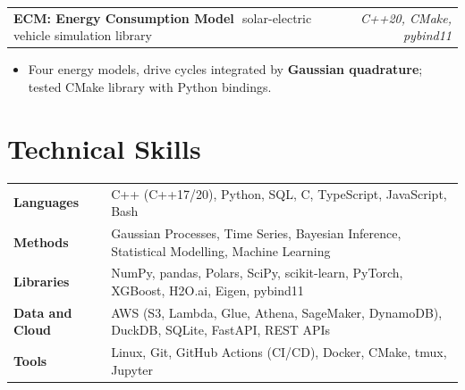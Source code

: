 \documentclass[10pt]{article}
\makeatletter
\newcommand{\project}[3]{%
  \vspace{3.5pt}%
  \begin{tabularx}{\linewidth}{@{}X r@{}}
    \textbf{#1}\,{\color{muted}\textbar}\, #2 & \textit{\color{muted}#3} \\
  \end{tabularx}\vspace{-1pt}}
\makeatother
\begin{document}
\project{ECM: Energy Consumption Model}{solar-electric vehicle simulation library}{C++20, CMake, pybind11}
\begin{itemize}
  \item Four energy models, drive cycles integrated by \textbf{Gaussian quadrature}; tested CMake library with Python bindings.
\end{itemize}

\section{Technical Skills}
\begin{tabularx}{\linewidth}{@{}p{2.95cm}X@{}}
  \textbf{Languages} & C++ (C++17/20), Python, SQL, C, TypeScript, JavaScript, Bash \\[1.5pt]
  \textbf{Methods} & Gaussian Processes, Time Series, Bayesian Inference, Statistical Modelling, Machine Learning \\[1.5pt]
  \textbf{Libraries} & NumPy, pandas, Polars, SciPy, scikit-learn, PyTorch, XGBoost, H2O.ai, Eigen, pybind11 \\[1.5pt]
  \textbf{Data and Cloud} & AWS (S3, Lambda, Glue, Athena, SageMaker, DynamoDB), DuckDB, SQLite, FastAPI, REST APIs \\[1.5pt]
  \textbf{Tools} & Linux, Git, GitHub Actions (CI/CD), Docker, CMake, tmux, Jupyter \\
\end{tabularx}
\end{document}
